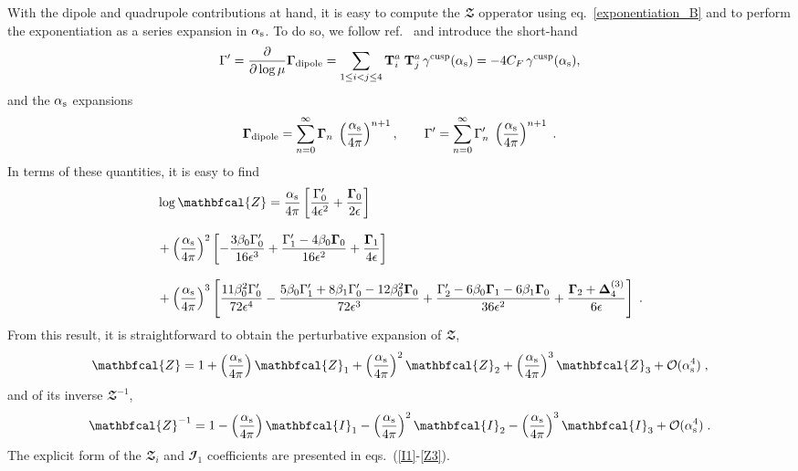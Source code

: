 With the dipole and quadrupole contributions at hand,
it is easy to compute the $\mathbfcal{Z}$ opperator using eq.~\eqref{exponentiation_B} and to perform the exponentiation as a series expansion in $\alpha_\mathrm{s}$.
To do so, we follow ref.~\cite{Becher:2009qa} and
introduce the short-hand
\begin{equation}
  \Gamma' = \frac{\partial}{\partial \log \mu} \mathbf{\Gamma}_{\text{dipole}} =
  \sum_{1\leq i < j \leq 4} \mathbf{T}^a_i \; \mathbf{T}^a_j\,
  \gamma^\text{cusp}(\alpha_\mathrm{s}) = - 4 C_F\, \gamma^\text{cusp}(\alpha_\mathrm{s}),
\end{equation}
and the $\alpha_\mathrm{s}$ expansions
\begin{equation}
\mathbf{\Gamma}_{\text{dipole}} = \sum_{n=0}^\infty \mathbf{\Gamma}_n \;  \left( \frac{\alpha_\mathrm{s}}{4 \pi} \right)^{n+1}, \quad  \quad \Gamma '=\sum_{n=0}^\infty \Gamma'_n \;  \left( \frac{\alpha_\mathrm{s}}{4 \pi} \right)^{n+1}\; .
\end{equation}
In terms of these quantities, it is easy to find
\begin{align}\label{logZ_B}
&\log \mathbfcal{Z} = \frac{\as}{4 \pi}  \left[ \frac{\Gamma'_0}{4 \epsilon^2} + \frac{\mathbf{\Gamma}_0}{2 \epsilon}\right] \nonumber\\[8pt]
& + \left( \frac{\as}{4 \pi} \right)^2  \left[- \frac{3 \beta_0 \Gamma'_0}{16 \epsilon^3} + \frac{\Gamma'_1 - 4 \beta_0 \mathbf{\Gamma}_0}{16 \epsilon^2} + \frac{\mathbf{\Gamma}_1}{4 \epsilon}  \right] \\[8pt]
&+\left(\frac{\as}{4 \pi}\right)^3 \left[ \frac{11 \beta_0^2 \Gamma_0'}{72 \epsilon^4}  - \frac{5 \beta_0  \Gamma_1' + 8 \beta_1 \Gamma_0' - 12 \beta_0^2 \mathbf{\Gamma}_0}{72 \epsilon^3} + \frac{\Gamma_2' - 6 \beta_0 \mathbf{\Gamma}_1 - 6 \beta_1 \mathbf{\Gamma}_0}{36 \epsilon^2}  + \frac{\mathbf{\Gamma}_2 + \mathbf{\Delta}^{(3)}_4}{6 \epsilon}\right] \; .\nonumber
\end{align} 
From this result, it is straightforward to obtain the perturbative
expansion of $\mathbfcal Z$,
\begin{equation}
\mathbfcal{Z} = 1 + \left( \frac{\as}{4\pi} \right)
\mathbfcal{Z}_1+ \left( \frac{\as}{4\pi} \right)^2 \mathbfcal{Z}_2 +
\left( \frac{\as}{4\pi} \right)^3 \mathbfcal{Z}_3 + \mathcal O(\as^4)\;,
\end{equation}
and of its inverse $\mathbfcal Z^{-1}$,
\begin{equation}\label{Zinverse_B}
\mathbfcal{Z}^{-1} = 1 - \left( \frac{\as}{4\pi}  \right) \mathbfcal{I}_1- \left( \frac{\as}{4\pi}  \right)^2 \mathbfcal{I}_2 - \left( \frac{\as}{4\pi}  \right)^3 \mathbfcal{I}_3 + \mathcal O(\as^4)\;.
\end{equation}
The explicit form of the $\mathbfcal Z_i$ and $\mathbfcal I_1$ coefficients
are presented in eqs.~(\ref{I1}-\ref{Z3}).
